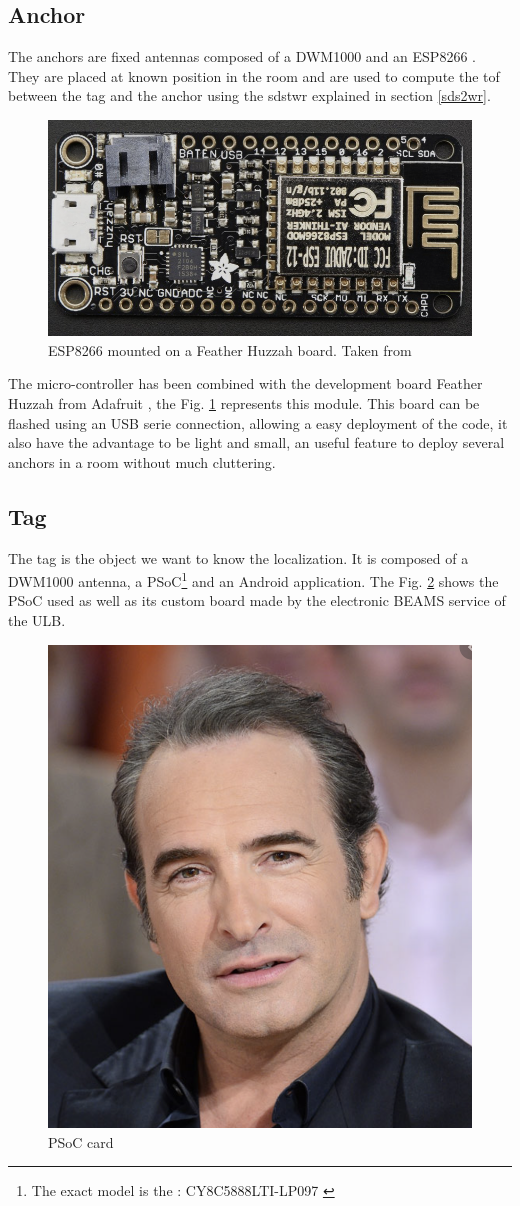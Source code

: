 \subsection{Anchor}

The anchors are fixed antennas composed of a DWM1000 and an ESP8266 \cite{esp8266}. They are placed at known position in the room and are used to compute the \gls{tof} between the tag and the anchor using the \gls{sdstwr} explained in section \ref{sds2wr}. 

\begin{figure}[H]
	\centering
	\includegraphics[width=.6\linewidth]{Images/esp8266.png}
	\caption{ESP8266 mounted on a Feather Huzzah board. Taken from \cite{adafruit}}
	\label{fig:esp8266}
\end{figure}

The micro-controller has been combined with the development board Feather Huzzah from Adafruit \cite{adafruit}, the Fig. \ref{fig:esp8266} represents this module. This board can be flashed using an USB serie connection, allowing a easy deployment of the code, it also have the advantage to be light and small, an useful feature to deploy several anchors in a room without much cluttering.

\subsection{Tag}

The tag is the object we want to know the localization. It is composed of a DWM1000 antenna, a PSoC\footnote{The exact model is the : CY8C5888LTI-LP097 \cite{guyard2019navigation}} and an Android application. The Fig. \ref{fig:psoc} shows the PSoC used as well as its custom board made by the electronic BEAMS service of the ULB.
\vspace{2mm}

\begin{figure}[H]
	\centering
	\includegraphics[width=.2\linewidth]{Images/Temporary_pic.png}
	\caption{PSoC card}
	\label{fig:psoc}
\end{figure}

